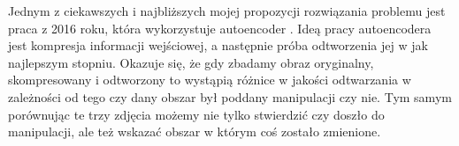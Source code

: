 Jednym z ciekawszych i najbliższych mojej propozycji rozwiązania problemu jest praca z 2016 roku, która wykorzystuje autoencoder \cite{auto}. Ideą pracy autoencodera jest kompresja informacji wejściowej, a następnie próba odtworzenia jej w jak najlepszym stopniu. Okazuje się, że gdy zbadamy obraz oryginalny, skompresowany i odtworzony to wystąpią różnice w jakości odtwarzania w zależności od tego czy dany obszar był poddany manipulacji czy nie. Tym samym porównując te trzy zdjęcia możemy nie tylko stwierdzić czy doszło do manipulacji, ale też wskazać obszar w którym coś zostało zmienione.